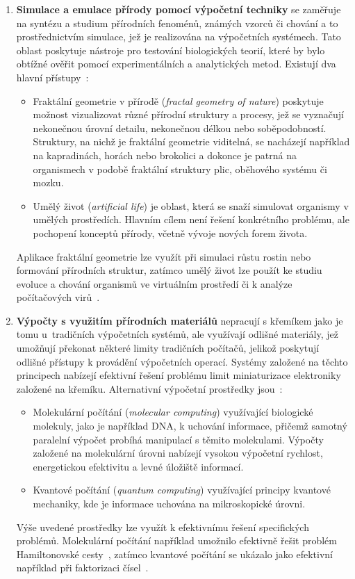 \begin{enumerate}
    \item \textbf{Simulace a emulace přírody pomocí výpočetní techniky}
        se zaměřuje na syntézu a studium přírodních fenoménů, známých vzorců či chování a to prostřednictvím simulace, jež je realizována na výpočetních systémech. 
        Tato oblast poskytuje nástroje pro testování biologických teorií, které by bylo obtížné ověřit pomocí experimentálních a analytických metod. 
        Existují dva hlavní přístupy~\cite{FundamentalNatural}:
        \begin{itemize}
            \item Fraktální geometrie v přírodě (\emph{fractal geometry of nature}) poskytuje možnost vizualizovat různé přírodní struktury a procesy, jež se vyznačují nekonečnou úrovní detailu, nekonečnou délkou nebo soběpodobností. 
                Struktury, na nichž je fraktální geometrie viditelná, se nacházejí například na kapradinách, horách nebo brokolici a dokonce je patrná na organismech v podobě fraktální struktury plic, oběhového systému či mozku. 
            \item Umělý život (\emph{artificial life}) je oblast, která se snaží simulovat organismy v umělých prostředích. 
                Hlavním cílem není řešení konkrétního problému, ale pochopení konceptů přírody, včetně vývoje nových forem života. 
        \end{itemize}
        Aplikace fraktální geometrie lze využít při simulaci růstu rostin nebo formování přírodních struktur, zatímco umělý život lze použít ke studiu evoluce a chování organismů ve virtuálním prostředí či k analýze počítačových virů~\cite{FundamentalNatural}. 
    \item \textbf{Výpočty s využitím přírodních materiálů} 
        nepracují s křemíkem jako je tomu u~tradičních výpočetních systémů, ale využívají odlišné materiály, jež umožňují překonat některé limity tradičních počítačů, jelikož poskytují odlišné přístupy k provádění výpočetních operací. 
        Systémy založené na těchto principech nabízejí efektivní řešení problému limit miniaturizace elektroniky založené na křemíku. 
        Alternativní výpočetní prostředky jsou~\cite{FundamentalNatural}:
        \begin{itemize}
            \item Molekulární počítání (\emph{molecular computing}) využívající biologické molekuly, jako je například DNA, k uchování informace, přičemž samotný paralelní výpočet probíhá manipulací s těmito molekulami. 
                Výpočty založené na molekulární úrovni nabízejí vysokou výpočetní rychlost, energetickou efektivitu a levné úložiště informací. 
            \item Kvantové počítání (\emph{quantum computing}) využívající principy kvantové mechaniky, kde je informace uchována na mikroskopické úrovni. 
        \end{itemize}
        Výše uvedené prostředky lze využít k efektivnímu řešení specifických problémů. 
        Molekulární počítání například umožnilo efektivně řešit problém Hamiltonovské cesty~\cite{molecular}, zatímco kvantové počítání se ukázalo jako efektivní například při faktorizaci čísel~\cite{shor}. 
\end{enumerate}
